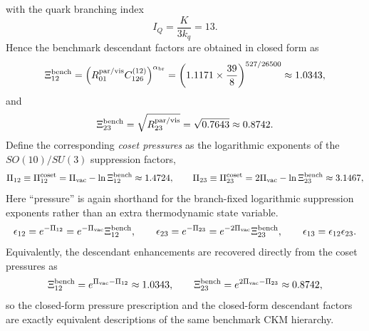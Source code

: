 \documentclass[11pt]{article}
\begin{document}
with the quark branching index
\begin{equation}
 I_Q=\frac{K}{3k_q}=13.
\end{equation}
Hence the benchmark descendant factors are obtained in closed form as
\begin{equation}
 \Xi_{12}^{\rm bench}
 =
 \left(R_{01}^{\rm par/vis}C_{126}^{(12)}\right)^{\alpha_{\rm br}}
 =
 \left(1.1171\times\frac{39}{8}\right)^{527/26500}
 \approx 1.0343,
\end{equation}
and
\begin{equation}
 \Xi_{23}^{\rm bench}
 =
 \sqrt{R_{23}^{\rm par/vis}}
 =
 \sqrt{0.7643}
 \approx 0.8742.
\end{equation}
Define the corresponding \emph{coset pressures} as the logarithmic exponents
of the $SO(10)/SU(3)$ suppression factors,
\begin{equation}
 \Pi_{12}\equiv\Pi_{12}^{\rm coset}=\Pi_{\rm vac}-\ln\Xi_{12}^{\rm bench}\approx 1.4724,
 \qquad
 \Pi_{23}\equiv\Pi_{23}^{\rm coset}=2\Pi_{\rm vac}-\ln\Xi_{23}^{\rm bench}\approx 3.1467,
\end{equation}
Here ``pressure'' is again shorthand for the branch-fixed logarithmic
suppression exponents rather than an extra thermodynamic state variable.
\begin{equation}
 \epsilon_{12}=e^{-\Pi_{12}}=e^{-\Pi_{\rm vac}}\Xi_{12}^{\rm bench},
 \qquad
 \epsilon_{23}=e^{-\Pi_{23}}=e^{-2\Pi_{\rm vac}}\Xi_{23}^{\rm bench},
 \qquad
 \epsilon_{13}=\epsilon_{12}\epsilon_{23}.
\end{equation}
Equivalently, the descendant enhancements are recovered directly from the
coset pressures as
\begin{equation}
 \Xi_{12}^{\rm bench}=e^{\Pi_{\rm vac}-\Pi_{12}}\approx 1.0343,
 \qquad
 \Xi_{23}^{\rm bench}=e^{2\Pi_{\rm vac}-\Pi_{23}}\approx 0.8742,
\end{equation}
so the closed-form pressure prescription and the closed-form descendant factors
are exactly equivalent descriptions of the same benchmark CKM hierarchy.
\end{document}
